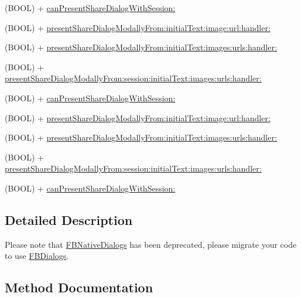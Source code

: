 \begin{DoxyCompactItemize}
(B\+O\+OL) + \hyperlink{interfaceFBNativeDialogs_a8b8d5049303db38cf3f214e0367ea424}{can\+Present\+Share\+Dialog\+With\+Session\+:}
\item 
(B\+O\+OL) + \hyperlink{interfaceFBNativeDialogs_a536cf508be27488381344840016d83a1}{present\+Share\+Dialog\+Modally\+From\+:initial\+Text\+:image\+:url\+:handler\+:}
\item 
(B\+O\+OL) + \hyperlink{interfaceFBNativeDialogs_a0b1838513861cd340a972af6cc612ca5}{present\+Share\+Dialog\+Modally\+From\+:initial\+Text\+:images\+:urls\+:handler\+:}
\item 
(B\+O\+OL) + \hyperlink{interfaceFBNativeDialogs_ac026f560c572059f42b7da1153e8e9cc}{present\+Share\+Dialog\+Modally\+From\+:session\+:initial\+Text\+:images\+:urls\+:handler\+:}
\item 
(B\+O\+OL) + \hyperlink{interfaceFBNativeDialogs_a8b8d5049303db38cf3f214e0367ea424}{can\+Present\+Share\+Dialog\+With\+Session\+:}
\item 
(B\+O\+OL) + \hyperlink{interfaceFBNativeDialogs_a536cf508be27488381344840016d83a1}{present\+Share\+Dialog\+Modally\+From\+:initial\+Text\+:image\+:url\+:handler\+:}
\item 
(B\+O\+OL) + \hyperlink{interfaceFBNativeDialogs_a0b1838513861cd340a972af6cc612ca5}{present\+Share\+Dialog\+Modally\+From\+:initial\+Text\+:images\+:urls\+:handler\+:}
\item 
(B\+O\+OL) + \hyperlink{interfaceFBNativeDialogs_ac026f560c572059f42b7da1153e8e9cc}{present\+Share\+Dialog\+Modally\+From\+:session\+:initial\+Text\+:images\+:urls\+:handler\+:}
\item 
(B\+O\+OL) + \hyperlink{interfaceFBNativeDialogs_a8b8d5049303db38cf3f214e0367ea424}{can\+Present\+Share\+Dialog\+With\+Session\+:}
\end{DoxyCompactItemize}


\subsection{Detailed Description}
Please note that {\ttfamily \hyperlink{interfaceFBNativeDialogs}{F\+B\+Native\+Dialogs}} has been deprecated, please migrate your code to use {\ttfamily \hyperlink{interfaceFBDialogs}{F\+B\+Dialogs}}. 

\subsection{Method Documentation}
\mbox{\label{interfaceFBNativeDialogs_a8b8d5049303db38cf3f214e0367ea424}} 
